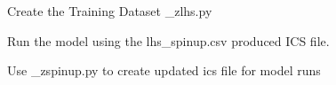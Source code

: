 
\begin{DoxyEnumerate}
\item Create the Training Dataset {\+\_\+zlhs.\+py}
\item Run the model using the {\ttfamily lhs\+\_\+spinup.\+csv} produced I\+CS file.
\item Use {\+\_\+zspinup.\+py} to create updated ics file for model runs 
\end{DoxyEnumerate}